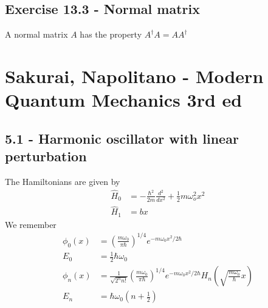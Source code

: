 \documentclass[../main.tex]{subfiles}
\begin{document}
\subsection{Exercise 13.3 - Normal matrix}
A normal matrix $A$ has the property $A^\dagger A=AA^\dagger$



\section{{\sc Sakurai, Napolitano} - Modern Quantum Mechanics 3rd ed}
\subsection{5.1 - Harmonic oscillator with linear perturbation}
The Hamiltonians are given by
\begin{align}
\hat{H}_0&=-\frac{\hbar^2}{2m}\frac{d^2}{dx^2}+\frac{1}{2}m\omega_o^2x^2\\
\hat{H}_1&=bx
\end{align}
We remember
\begin{align}
\phi_0(x)&=\left(\frac{m\omega_0}{\pi\hbar}\right)^{1/4}e^{-m\omega_0x^2/2\hbar}\\
E_0&=\frac{1}{2}\hbar\omega_0\\
\phi_n(x)&=\frac{1}{\sqrt{2^n n!}}\left(\frac{m\omega_0}{\pi\hbar}\right)^{1/4}e^{-m\omega_0x^2/2\hbar}H_n\left(\sqrt{\frac{m\omega_0}{\hbar}}x\right)\\
E_n&=\hbar\omega_0\left(n+\frac{1}{2}\right)
\end{align}
\end{document}

